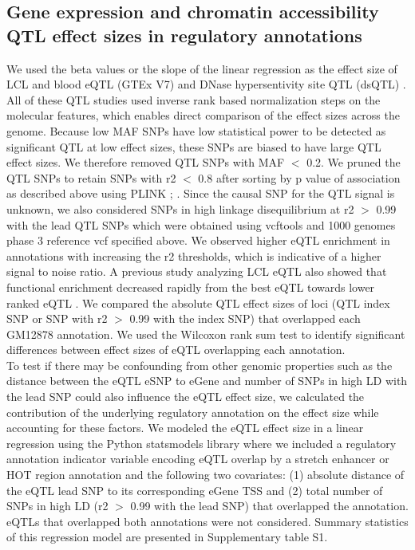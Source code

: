\subsection{Gene expression and chromatin accessibility QTL effect sizes in regulatory annotations}
We used the beta values or the slope of the linear regression as the effect size of LCL and blood eQTL (GTEx V7) and DNase hypersentivity site QTL (dsQTL) \cite{degnerDNaseSensitivityQTLs2012}. All of these QTL studies used inverse rank based normalization steps on the molecular features, which enables direct comparison of the effect sizes across the genome. Because low MAF SNPs have low statistical power to be detected as significant QTL at low effect sizes, these SNPs are biased to have large QTL effect sizes. We therefore removed QTL SNPs with MAF $<$ 0.2. We pruned the QTL SNPs to retain SNPs with r2 $<$ 0.8 after sorting by p value of association as described above using PLINK \cite{purcellPLINKToolSet2007}; \cite{changSecondgenerationPLINKRising2015}. Since the causal SNP for the QTL signal is unknown, we also considered SNPs in high linkage disequilibrium at r2 $>$ 0.99 with the lead QTL SNPs which were obtained using vcftools\cite{danecekVariantCallFormat2011} and 1000 genomes phase 3 reference vcf specified above. We observed higher eQTL enrichment in annotations with increasing the r2 thresholds, which is indicative of a higher signal to noise ratio. A previous study analyzing LCL eQTL also showed that functional enrichment decreased rapidly from the best eQTL towards lower ranked eQTL \cite{lappalainenTranscriptomeGenomeSequencing2013}. We compared the absolute QTL effect sizes of loci (QTL index SNP or SNP with r2 $>$ 0.99 with the index SNP) that overlapped each GM12878 annotation. We used the Wilcoxon rank sum test to identify significant differences between effect sizes of eQTL overlapping each annotation. \\
To test if there may be confounding from other genomic properties such as the distance between the eQTL eSNP to eGene and number of SNPs in high LD with the lead SNP could also influence the eQTL effect size, we calculated the contribution of the underlying regulatory annotation on the effect size while accounting for these factors. We modeled the eQTL effect size in a linear regression using the Python statsmodels library where we included a regulatory annotation indicator variable encoding eQTL overlap by a stretch enhancer or HOT region annotation and the following two covariates: (1) absolute distance of the eQTL lead SNP to its corresponding eGene TSS and (2) total number of SNPs in high LD (r2 $>$ 0.99 with the lead SNP) that overlapped the annotation. eQTLs that overlapped both annotations were not considered. Summary statistics of this regression model are presented in Supplementary table S1. \\


